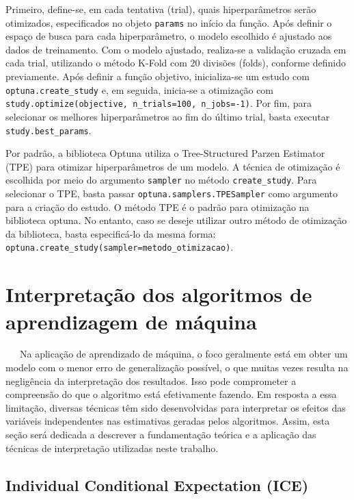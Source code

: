 \documentclass[
  12pt,
  a4paper,
]{scrreprt}
\begin{document}
Primeiro, define-se, em cada tentativa (trial), quais hiperparâmetros
serão otimizados, especificados no objeto \texttt{params} no início da
função. Após definir o espaço de busca para cada hiperparâmetro, o
modelo escolhido é ajustado aos dados de treinamento. Com o modelo
ajustado, realiza-se a validação cruzada em cada trial, utilizando o
método K-Fold com 20 divisões (folds), conforme definido previamente.
Após definir a função objetivo, inicializa-se um estudo com
\texttt{optuna.create\_study} e, em seguida, inicia-se a otimização com
\texttt{study.optimize(objective,\ n\_trials=100,\ n\_jobs=-1)}. Por
fim, para selecionar os melhores hiperparâmetros ao fim do último trial,
basta executar \texttt{study.best\_params}.

\vspace{12pt}

Por padrão, a biblioteca Optuna utiliza o Tree-Structured Parzen
Estimator (TPE) para otimizar hiperparâmetros de um modelo. A técnica de
otimização é escolhida por meio do argumento \texttt{sampler} no método
\texttt{create\_study}. Para selecionar o TPE, basta passar
\texttt{optuna.samplers.TPESampler} como argumento para a criação do
estudo. O método TPE é o padrão para otimização na biblioteca optuna. No
entanto, caso se deseje utilizar outro método de otimização da
biblioteca, basta especificá-lo da mesma forma:
\texttt{optuna.create\_study(sampler=metodo\_otimizacao)}.

\newpage

\section{Interpretação dos algoritmos de aprendizagem de
máquina}\label{interpretauxe7uxe3o-dos-algoritmos-de-aprendizagem-de-muxe1quina}

~~~Na aplicação de aprendizado de máquina, o foco geralmente está em
obter um modelo com o menor erro de generalização possível, o que muitas
vezes resulta na negligência da interpretação dos resultados. Isso pode
comprometer a compreensão do que o algoritmo está efetivamente fazendo.
Em resposta a essa limitação, diversas técnicas têm sido desenvolvidas
para interpretar os efeitos das variáveis independentes nas estimativas
geradas pelos algoritmos. Assim, esta seção será dedicada a descrever a
fundamentação teórica e a aplicação das técnicas de interpretação
utilizadas neste trabalho.

\subsection{Individual Conditional Expectation
(ICE)}\label{individual-conditional-expectation-ice}
\end{document}
